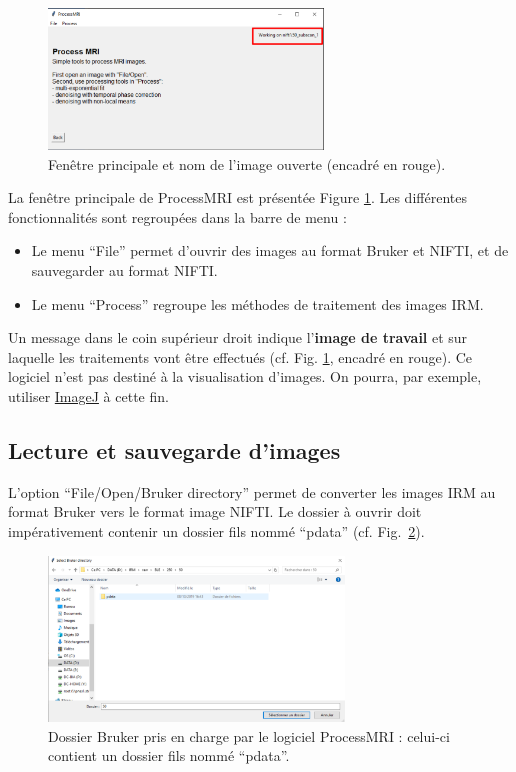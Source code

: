 \documentclass[french]{article}
\begin{document}
\begin{figure}[ht]
  \centering
  \includegraphics[width=0.65\textwidth]{fig/ecran_ppal_nifti_loaded_red}
  \caption{Fenêtre principale et nom de l'image ouverte (encadré en
    rouge).}
  \label{fig:ecran_ppal_nifti_loaded_red}
\end{figure}

La fenêtre principale de ProcessMRI est présentée Figure
\ref{fig:ecran_ppal_nifti_loaded_red}. Les différentes fonctionnalités
sont regroupées dans la barre de menu :
\begin{itemize}
\item Le menu ``File'' permet d'ouvrir des images au format Bruker et
  NIFTI, et de sauvegarder au format NIFTI.
\item Le menu ``Process'' regroupe les méthodes de traitement des
  images IRM.
\end{itemize}


Un message dans le coin supérieur droit indique l'\textbf{image de travail} et sur
laquelle les traitements vont être effectués (cf. Fig.
\ref{fig:ecran_ppal_nifti_loaded_red}, encadré en rouge). Ce logiciel
n'est pas destiné à la visualisation d'images. On pourra, par exemple,
utiliser \href{https://imagej.nih.gov/ij/download.html}{ImageJ} à
cette fin.

\subsection{Lecture et sauvegarde d'images}
\label{sec:lect-et-sauv}
L'option ``File/Open/Bruker directory'' permet de converter les images
IRM au format Bruker vers le format image NIFTI. Le dossier à ouvrir
doit impérativement contenir un dossier fils nommé ``pdata'' (cf.
Fig.~\ref{fig:open_bruker2}).

\begin{figure}[ht]
  \centering \includegraphics[width=0.7\textwidth]{fig/open_bruker2}
  \caption{Dossier Bruker pris en charge par le logiciel ProcessMRI :
    celui-ci contient un dossier fils nommé ``pdata''.}
  \label{fig:open_bruker2}
\end{figure}
\end{document}
